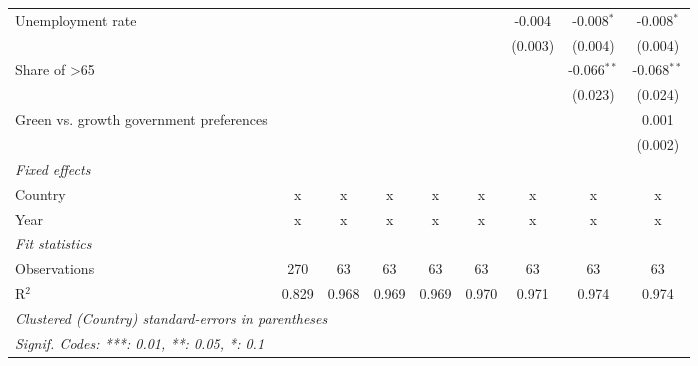 \begin{table}[htbp]
\begin{tabular}{lcccccccc}
      Unemployment rate                                         &         &         &         &         &         & -0.004  & -0.008$^{*}$  & -0.008$^{*}$\\   
                                                                &         &         &         &         &         & (0.003) & (0.004)       & (0.004)\\   
      Share of >65                                              &         &         &         &         &         &         & -0.066$^{**}$ & -0.068$^{**}$\\   
                                                                &         &         &         &         &         &         & (0.023)       & (0.024)\\   
      Green vs. growth government preferences                   &         &         &         &         &         &         &               & 0.001\\   
                                                                &         &         &         &         &         &         &               & (0.002)\\   
      \emph{Fixed effects}\\
      Country                                                   & x       & x       & x       & x       & x       & x       & x             & x\\  
      Year                                                      & x       & x       & x       & x       & x       & x       & x             & x\\  
      \midrule \emph{Fit statistics}\\
      Observations                                              & 270     & 63      & 63      & 63      & 63      & 63      & 63            & 63\\  
      R$^2$                                                     & 0.829   & 0.968   & 0.969   & 0.969   & 0.970   & 0.971   & 0.974         & 0.974\\  
      \midrule
      \multicolumn{9}{l}{\emph{Clustered (Country) standard-errors in parentheses}}\\
      \multicolumn{9}{l}{\emph{Signif. Codes: ***: 0.01, **: 0.05, *: 0.1}}\\
   \end{tabular}
\end{table}


